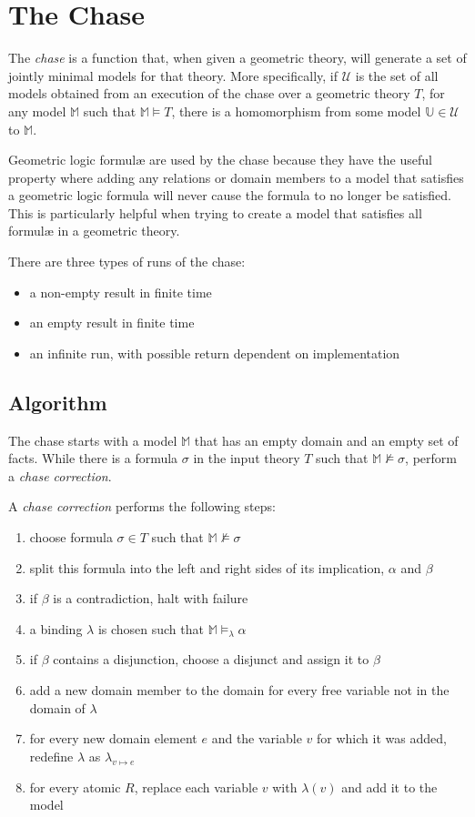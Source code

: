 \section{The Chase}

	The \emph{chase} is a function that, when given a geometric theory, will
	generate a set of jointly minimal models for that theory. More
	specifically, if $\mathcal{U}$ is the set of all models obtained from an
	execution of the chase over a geometric theory $T$, for any model
	$\mathbb{M}$ such that $\mathbb{M} \models T$, there is a homomorphism from
	some model $\mathbb{U} \in \mathcal{U}$ to $\mathbb{M}$.

	Geometric logic formul{\ae} are used by the chase because they have the
	useful property where adding any relations or domain members to a model
	that satisfies a geometric logic formula will never cause the formula to no
	longer be satisfied. This is particularly helpful when trying to create a
	model that satisfies all formul{\ae} in a geometric theory.

	There are three types of runs of the chase:
	\begin{itemize}
	\item a non-empty result in finite time
	\item an empty result in finite time
	\item an infinite run, with possible return dependent on implementation
	\end{itemize}

	\subsection{Algorithm}

		The chase starts with a model $\mathbb{M}$ that has an empty domain and
		an empty set of facts. While there is a formula $\sigma$ in the input
		theory $T$ such that $\mathbb{M} \not\models \sigma$, perform a
		\emph{chase correction}.

		A \emph{chase correction} performs the following steps:
		\begin{enumerate}
		\item choose formula $\sigma \in T$ such that $\mathbb{M} \not\models \sigma$
		\item split this formula into the left and right sides of its implication, $\alpha$ and $\beta$
		\item if $\beta$ is a contradiction, halt with failure
		\item a binding $\lambda$ is chosen such that $\mathbb{M} \models_\lambda \alpha$
		\item if $\beta$ contains a disjunction, choose a disjunct and assign it to $\beta$
		\item add a new domain member to the domain for every free variable not in the domain of $\lambda$
		\item for every new domain element $e$ and the variable $v$ for which it was added, redefine $\lambda$ as $\lambda_{v \mapsto e}$
		\item for every atomic $R$, replace each variable $v$ with $\lambda(v)$ and add it to the model
		\end{enumerate}

